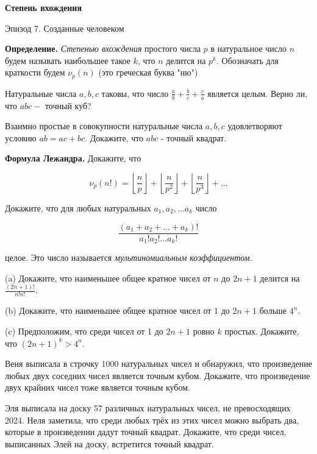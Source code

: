\centerline{\bf \Huge Степень вхождения}

\begin{flushright}
        \scriptsize{Эпизод 7. Созданные человеком}
\end{flushright}


\textbf{Определение.} \textit{Степенью вхождения} простого числа $p$ в натуральное число $n$ будем называть наибольшее такое $k$, что $n$ делится на $p^k$. Обозначать для краткости будем $\nu_p(n)$ (это греческая буква "ню")


Натуральные числа $a, b, c$ таковы, что число $\frac{a}{b}+\frac{b}{c}+\frac{c}{a}$ является целым. Верно ли, что $a b c-$ точный куб?


Взаимно простые в совокупности натуральные числа $a, b, c$ удовлетворяют условию $a b=a c+b c$. Докажите, что $a b c$ - точный квадрат.

\textbf{Формула Лежандра.} Докажите, что

$$
\nu_p(n!)=\left\lfloor\frac{n}{p}\right\rfloor+\left\lfloor\frac{n}{p^2}\right\rfloor+\left\lfloor\frac{n}{p^3}\right\rfloor+\ldots
$$

 Докажите, что для любых натуральных $a_1, a_2, \ldots a_k$ число

$$
\frac{\left(a_1+a_2+\ldots+a_k\right)!}{a_{1}!a_{2}!\ldots a_{k}!}
$$


целое. Это число называется \textit{мультиномиальным коэффициентом}.

 (a) Докажите, что наименьшее общее кратное чисел от $n$ до $2 n+1$ делится на $\frac{(2 n+1)!}{n!n!}$.

(b) Докажите, что наименьшее общее кратное чисел от 1 до $2 n+1$ больше $4^n$.

(c) Предположим, что среди чисел от 1 до $2 n+1$ ровно $k$ простых. Докажите, что $(2 n+1)^k>4^n$.

Веня выписала в строчку 1000 натуральных чисел и обнаружил, что произведение любых двух соседних чисел является точным кубом. Докажите, что произведение двух крайних чисел тоже является точным кубом.

Эля выписала на доску 57 различных натуральных чисел, не превосходящих 2024. Неля заметила, что среди любых трёх из этих чисел можно выбрать два, которые в произведении дадут точный квадрат. Докажите, что среди чисел, выписанных Элей на доску, встретится точный квадрат.